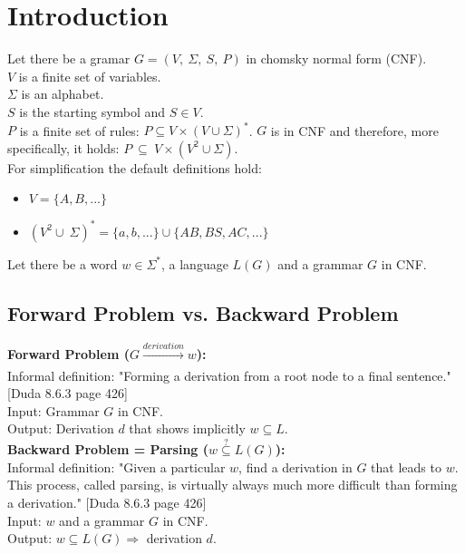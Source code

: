 
\section{Introduction}\label{Introduction}

\noindent Let there be a gramar $G=(V,\ \Sigma,\ S,\ P)$ in chomsky normal form (CNF).\\
$V$ is a finite set of variables. \\
$\Sigma$ is an alphabet. \\
$S$ is the starting symbol and $S \in V$. \\
$P$ is a finite set of rules: $P \subseteq V \times (V \cup \Sigma)^{*}$. $G$ is in CNF and therefore, more specifically, it holds:  $P\ \subseteq\ V \times (V^{2} \cup \Sigma)$.\\
 
\noindent For simplification the default definitions hold:
\begin{itemize}
	\item $V = \{A, B, ...\}$
	\item $(V^2 \cup\ \Sigma)^{*}=\{a, b, ...\} \cup \{AB, BS, AC, ... \}$
\end{itemize}

\noindent Let there be a word $w \in \Sigma^*$, a language $L(G)$ and a grammar $G$ in CNF. 

\subsection{Forward Problem vs. Backward Problem}

\noindent\textbf{Forward Problem ($G \xrightarrow[]{derivation} w$):}\\
Informal definition: "Forming a derivation from a root node to a final sentence."  [Duda 8.6.3 page 426]\\
Input: Grammar $G$ in CNF.\\
Output: Derivation $d$ that shows implicitly $w \subseteq L$.\\

\noindent\textbf{Backward Problem = Parsing ($w\overset{?}{\subseteq}L(G)$):}\\
Informal definition: "Given a particular $w$, find a derivation in $G$ that leads to $w$. This process, called parsing, is virtually always much more difficult than forming a derivation."  [Duda 8.6.3 page 426]\\
Input: $w$ and a grammar $G$ in CNF.\\
Output: $w \subseteq L(G) \Longrightarrow$ derivation $d$.\\

